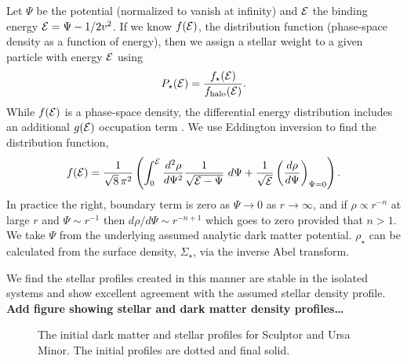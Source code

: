 Let \(\Psi\) be the potential (normalized to vanish at infinity) and
\({\cal E}\) the binding energy \({\cal E} = \Psi - 1/2 v^2\). If we
know \(f({\cal E})\), the distribution function (phase-space density as
a function of energy), then we assign a stellar weight to a given
particle with energy \({\cal E}\) using \begin{equation}{
P_\star({\cal E}) = \frac{f_\star({\cal E})}{f_{\rm halo}({\cal E})}.
}\end{equation} While \(f({\cal E})\) is a phase-space density, the
differential energy distribution includes an additional \(g({\cal E})\)
occupation term \citep{BT1987}. We use Eddington inversion to find the
distribution function, \citep[eq. 4-140b in][]{BT1987} \begin{equation}{
f({\cal E}) = \frac{1}{\sqrt{8}\, \pi^2}\left( \int_0^{\cal E} \frac{d^2\rho}{d\Psi^2} \frac{1}{\sqrt{{\cal E} - \Psi}}\ d\Psi + \frac{1}{\sqrt{\cal E}} \left(\frac{d\rho}{d\Psi}\right)_{\Psi=0} \right).
}\end{equation} In practice the right, boundary term is zero as
\(\Psi \to 0\) as \(r\to\infty\), and if \(\rho \propto r^{-n}\) at
large \(r\) and \(\Psi \sim r^{-1}\) then
\(d\rho / d\Psi \sim r^{-n+1}\) which goes to zero provided that
\(n > 1\). We take \(\Psi\) from the underlying assumed analytic dark
matter potential. \(\rho_\star\) can be calculated from the surface
density, \(\Sigma_\star\), via the inverse Abel transform.

We find the stellar profiles created in this manner are stable in the
isolated systems and show excellent agreement with the assumed stellar
density profile. \textbf{Add figure showing stellar and dark matter
density profiles\ldots{}}

\begin{figure}
\centering
{}
\caption[Initial stellar systems]{The initial dark matter and stellar
profiles for Sculptor and Ursa Minor. The initial profiles are dotted
and final solid.}
\end{figure}
